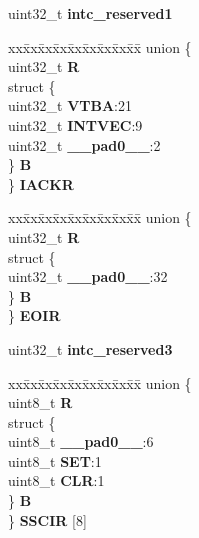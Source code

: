 \begin{DoxyCompactItemize}
\begin{tabbing}
\end{tabbing}\item 
\mbox{\label{structINTC__tag_a5f8726aa204960d95a4045eff8f5cbd7}} 
uint32\+\_\+t {\bfseries intc\+\_\+reserved1}
\item 
\mbox{\label{structINTC__tag_a320c1000a5e96436eb578b1e6cd435a4}} 
\begin{tabbing}
xx\=xx\=xx\=xx\=xx\=xx\=xx\=xx\=xx\=\kill
union \{\\
\>uint32\_t {\bfseries R}\\
\>struct \{\\
\>\>uint32\_t {\bfseries VTBA}:21\\
\>\>uint32\_t {\bfseries INTVEC}:9\\
\>\>uint32\_t {\bfseries \_\_pad0\_\_}:2\\
\>\} {\bfseries B}\\
\} {\bfseries IACKR}\\

\end{tabbing}\item 
\mbox{\label{structINTC__tag_a82ab4c5ed76c73c29c2dff27c6b9b1d7}} 
\begin{tabbing}
xx\=xx\=xx\=xx\=xx\=xx\=xx\=xx\=xx\=\kill
union \{\\
\>uint32\_t {\bfseries R}\\
\>struct \{\\
\>\>uint32\_t {\bfseries \_\_pad0\_\_}:32\\
\>\} {\bfseries B}\\
\} {\bfseries EOIR}\\

\end{tabbing}\item 
\mbox{\label{structINTC__tag_a330f76d2fdc838754f0e313e7d017c81}} 
uint32\+\_\+t {\bfseries intc\+\_\+reserved3}
\item 
\mbox{\label{structINTC__tag_a69110bef498c0aa0e76d33471efe864f}} 
\begin{tabbing}
xx\=xx\=xx\=xx\=xx\=xx\=xx\=xx\=xx\=\kill
union \{\\
\>uint8\_t {\bfseries R}\\
\>struct \{\\
\>\>uint8\_t {\bfseries \_\_pad0\_\_}:6\\
\>\>uint8\_t {\bfseries SET}:1\\
\>\>uint8\_t {\bfseries CLR}:1\\
\>\} {\bfseries B}\\
\} {\bfseries SSCIR} \mbox{[}8\mbox{]}\\


\end{tabbing}
\end{DoxyCompactItemize}
